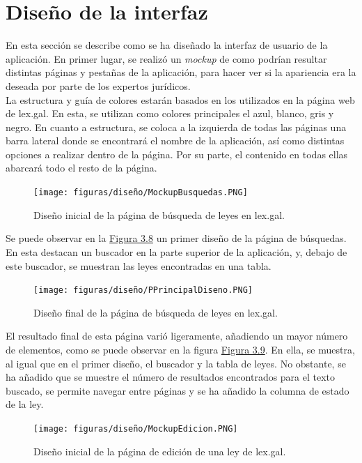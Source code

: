 \section{Diseño de la interfaz}

En esta sección se describe como se ha diseñado la interfaz de usuario de la aplicación. En primer lugar, se realizó un {\it mockup} \cite{mockup} de como podrían resultar distintas páginas y pestañas de la aplicación, para hacer ver si la apariencia era la deseada por parte de los expertos jurídicos.
\\

La estructura y guía de colores estarán basados en los utilizados en la página web de lex.gal. En esta, se utilizan como colores principales el azul, blanco, gris y negro. En cuanto a estructura, se coloca a la izquierda de todas las páginas una barra lateral donde se encontrará el nombre de la aplicación, así como distintas opciones a realizar dentro de la página. Por su parte, el contenido en todas ellas abarcará todo el resto de la página.

\begin{figure}[H]
\centerline{\texttt{[image: figuras/diseño/MockupBusquedas.PNG]}}
\caption{Diseño inicial de la página de búsqueda de leyes en lex.gal.}
\label{enlaceMockupPrincipalDiseno}
\end{figure}

Se puede observar en la \hyperref[enlaceMockupPrincipalDiseno]{Figura 3.8} un primer diseño de la página de búsquedas. En esta destacan un buscador en la parte superior de la aplicación, y, debajo de este buscador, se muestran las leyes encontradas en una tabla.

\begin{figure}[H]
\centerline{\texttt{[image: figuras/diseño/PPrincipalDiseno.PNG]}}
\caption{Diseño final de la página de búsqueda de leyes en lex.gal.}
\label{enlacePPrincipalDiseno}
\end{figure}

El resultado final de esta página varió ligeramente, añadiendo un mayor número de elementos, como se puede observar en la figura \hyperref[enlacePPrincipalDiseno]{Figura 3.9}. En ella, se muestra, al igual que en el primer diseño, el buscador y la tabla de leyes. No obstante, se ha añadido que se muestre el número de resultados encontrados para el texto buscado, se permite navegar entre páginas y se ha añadido la columna de estado de la ley.

\begin{figure}[H]
\centerline{\texttt{[image: figuras/diseño/MockupEdicion.PNG]}}
\caption{Diseño inicial de la página de edición de una ley de lex.gal.}
\label{enlaceMockupEdicionDiseno}
\end{figure}

